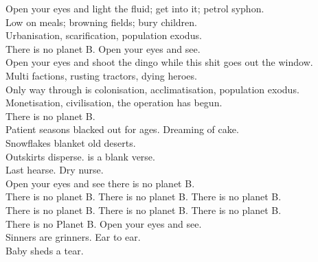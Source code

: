 \label{album:infest-the-rats-nest}




Open your eyes and light the fluid; get into it; petrol syphon. \\
Low on meals; browning fields; bury children. \\
Urbanisation, scarification, population exodus. \\
There is no planet B. Open your eyes and see. \\

Open your eyes and shoot the dingo while this shit goes out the window. \\
Multi factions, rusting tractors, dying heroes. \\

Only way through is colonisation, acclimatisation, population exodus. \\
Monetisation, civilisation, the operation has begun. \\
There is no planet B. \\

Patient seasons blacked out for ages. Dreaming of cake. \\
Snowflakes blanket old deserts. \\
Outskirts disperse.  is a blank verse. \\
Last hearse. Dry nurse. \\

Open your eyes and see there is no planet B. \\
There is no planet B. There is no planet B. There is no planet B. \\
There is no planet B. There is no planet B. There is no planet B. \\
There is no Planet B. Open your eyes and see. \\

Sinners are grinners. Ear to ear. \\
Baby  sheds a tear. \\




